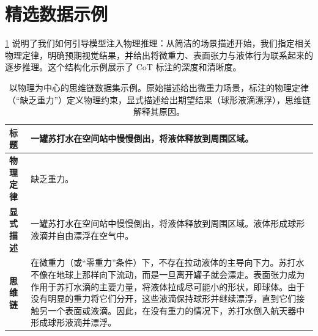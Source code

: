 \clearpage
\setcounter{page}{1}
\maketitlesupplementary


\section{精选数据示例}
\cref{tab:cot-example} 说明了我们如何引导模型注入物理推理：从简洁的场景描述开始，我们指定相关物理定律，明确预期视觉结果，并给出将微重力、表面张力与液体行为联系起来的逐步推理。这个结构化示例展示了 CoT 标注的深度和清晰度。
\begin{table}[h]
  \caption{以物理为中心的思维链数据集示例。原始描述给出微重力场景，标注的物理定律（“缺乏重力”）定义物理约束，显式描述给出期望结果（球形液滴漂浮），思维链解释其原因。}
  \centering
  \begin{tabular}{@{}p{3cm}p{10cm}@{}}
    \toprule
    \textbf{标题} & 一罐苏打水在空间站中慢慢倒出，将液体释放到周围区域。 \\
    \midrule
    \textbf{物理定律} & 缺乏重力。 \\
    \midrule
    \textbf{显式描述} & 一罐苏打水在空间站中慢慢倒出，将液体释放到周围区域。液体形成球形液滴并自由漂浮在空气中。 \\
    \midrule
    \textbf{思维链} & 在微重力（或“零重力”条件）下，不存在拉动液体的主导向下力。苏打水不像在地球上那样向下流动，而是一旦离开罐子就会漂走。表面张力成为作用于苏打水滴的主要力量，将液体拉成尽可能小的形状，即球体。由于没有明显的重力将它们分开，这些液滴保持球形并继续漂浮，直到它们接触另一个表面或液滴。因此，在没有重力的情况下，苏打水倒入航天器中形成球形液滴并漂浮。 \\
    \bottomrule
  \end{tabular}
  \label{tab:cot-example}
\end{table}


